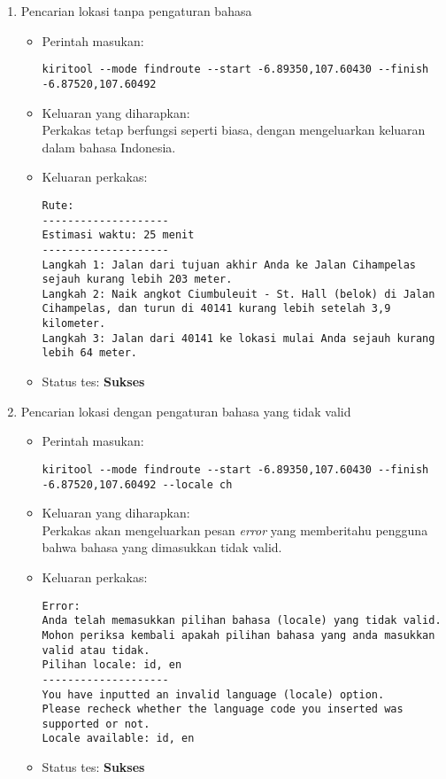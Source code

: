 \begin{enumerate}
	\item Pencarian lokasi tanpa pengaturan bahasa
	\begin{itemize}
		\item Perintah masukan:
		\begin{lstlisting}
kiritool --mode findroute --start -6.89350,107.60430 --finish -6.87520,107.60492
		\end{lstlisting}
		\item Keluaran yang diharapkan: \\
		Perkakas tetap berfungsi seperti biasa, dengan mengeluarkan keluaran dalam bahasa Indonesia.
		\item Keluaran perkakas:
		\begin{lstlisting}
Rute:
--------------------
Estimasi waktu: 25 menit 
--------------------
Langkah 1: Jalan dari tujuan akhir Anda ke Jalan Cihampelas sejauh kurang lebih 203 meter.
Langkah 2: Naik angkot Ciumbuleuit - St. Hall (belok) di Jalan Cihampelas, dan turun di 40141 kurang lebih setelah 3,9 kilometer.
Langkah 3: Jalan dari 40141 ke lokasi mulai Anda sejauh kurang lebih 64 meter.
		\end{lstlisting}
		\item Status tes: \textbf{Sukses}
	\end{itemize}
	
	\item Pencarian lokasi dengan pengaturan bahasa yang tidak valid
	\begin{itemize}
		\item Perintah masukan:
		\begin{lstlisting}
kiritool --mode findroute --start -6.89350,107.60430 --finish -6.87520,107.60492 --locale ch
		\end{lstlisting}
		\item Keluaran yang diharapkan: \\
		Perkakas akan mengeluarkan pesan \textit{error} yang memberitahu pengguna bahwa bahasa yang dimasukkan tidak valid.
		\item Keluaran perkakas:
		\begin{lstlisting}
Error:
Anda telah memasukkan pilihan bahasa (locale) yang tidak valid.
Mohon periksa kembali apakah pilihan bahasa yang anda masukkan valid atau tidak.
Pilihan locale: id, en
--------------------
You have inputted an invalid language (locale) option.
Please recheck whether the language code you inserted was supported or not.
Locale available: id, en
		\end{lstlisting}
		\item Status tes: \textbf{Sukses}
	\end{itemize}
	
\end{enumerate}

